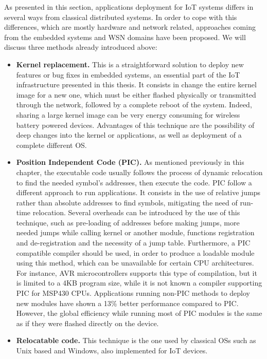 As presented in this section, applications deployment for IoT systems differs in several ways from classical distributed systems.
In order to cope with this differences, which are mostly hardware and network related, approaches coming from the embedded systems and WSN domains have been proposed.
We will discuss three methods already introduced above: 
\begin{itemize}
	\item \textbf{Kernel replacement.} This is a straightforward solution to deploy new features or bug fixes in embedded systems, an essential part of the IoT infrastructure presented in this thesis.
	It consists in change the entire kernel image for a new one, which must be either flashed physically or transmitted through the network, followed by a complete reboot of the system.
	Indeed, sharing a large kernel image can be very energy consuming for wireless battery powered devices.
	Advantages of this technique are the possibility of deep changes into the kernel or applications, as well as deployment of a complete different OS.
	\item \textbf{Position Independent Code (PIC).} As mentioned previously in this chapter, the executable code usually follows the process of dynamic relocation to find the needed symbol's addresses, then execute the code. 
	PIC follow a different approach to run applications. 
	It consists in the use of relative jumps rather than absolute addresses to find symbols, mitigating the need of run-time relocation.
	Several overheads can be introduced by the use of this technique, such as pre-loading of addresses before making jumps, more needed jumps while calling kernel or another module, functions registration and de-registration and the necessity of a jump table.
	Furthermore, a PIC compatible compiler should be used, in order to produce a loadable module using this method, which can be unavailable for certain CPU architectures.
	For instance, AVR microcontrollers supports this type of compilation, but it is limited to a 4KB program size, while it is not known a compiler supporting PIC for MSP430 CPUs.
	Applications running non-PIC methods to deploy new modules have shown a 13\% better performance compared to PIC\cite{dong2009dynamic}.
	However, the global efficiency while running most of PIC modules is the same as if they were flashed directly on the device.
	\item \textbf{Relocatable code.} This technique is the one used by classical OSs such as Unix based and Windows, also implemented for IoT devices\cite{dunkels06runtime}. 

\end{itemize}
